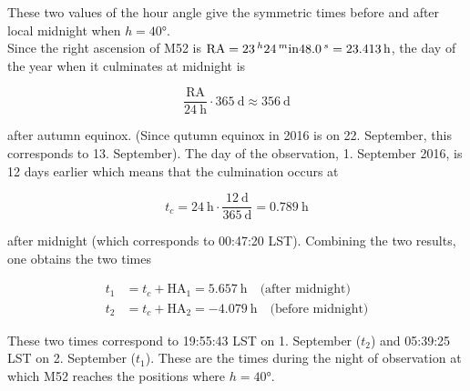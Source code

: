 \documentclass[11pt,a4paper,twoside]{article}
\begin{document}
These two values of the hour angle give the symmetric times before and after local midnight when $h=\ang{40}$. \\

Since the right ascension of M52 is $\text{RA} = \SI{23}{^\hour} \SI{24}{^\minute} \SI{48.0}{^\second} = \SI{23.413}{\hour}$, the day of the year when it culminates at midnight is 

\begin{equation}
 \frac{\text{RA}}{\SI{24}{\hour}} \cdot \SI{365}{\day} \approx \SI{356}{\day}
\end{equation}

after autumn equinox. (Since qutumn equinox in 2016 is on 22. September, this corresponds to 13. September). The day of the observation, 1. September 2016, is 12 days earlier which means that the culmination occurs at 

\begin{equation}
 t_c = \SI{24}{\hour} \cdot \frac{\SI{12}{\day}}{\SI{365}{\day}} = \SI{0.789}{\hour}
\end{equation}

after midnight (which corresponds to 00:47:20 LST). Combining the two results, one obtains the two times 

\begin{align}
 t_1 &= t_c + \text{HA}_1 = \SI{5.657}{\hour} \quad \text{(after midnight)} \\
 t_2 &= t_c + \text{HA}_2 = \SI{-4.079}{\hour} \quad \text{(before midnight)}
\end{align}

These two times correspond to 19:55:43 LST on 1. September ($t_2$) and 05:39:25 LST on 2. September ($t_1$). These are the times during the night of observation at which M52 reaches the positions where $h=\ang{40}$.  
\end{document}
